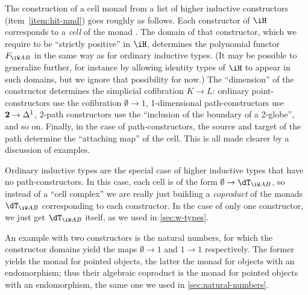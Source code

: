\documentclass{amsart}
\let\W\iW
\begin{document}
The construction of a cell monad from a list of higher inductive constructors (item~\ref{item:hit-mnd}) goes roughly as follows.
Each constructor of $\iH$ corresponds to a \emph{cell} of the monad \dT.
The domain of that constructor, which we require to be ``strictly positive'' in $\iH$, determines the polynomial functor $F_{\W A B}$ in the same way as for ordinary inductive types.
(It may be possible to generalize further, for instance by allowing identity types of $\iH$ to appear in such domains, but we ignore that possibility for now.)
The ``dimension'' of the constructor determines the simplicial cofibration $K\to L$: ordinary point-constructors use the cofibration $\emptyset\to 1$, 1-dimensional path-constructors use $\mathbf{2}\to{\Delta^1}$, 2-path constructors use the ``inclusion of the boundary of a 2-globe'', and so on.
Finally, in the case of path-constructors, the source and target of the path determine the ``attaching map'' of the cell.
This is all made clearer by a discussion of examples.

\begin{eg} \label{eg:ordinary-inductives}
  Ordinary inductive types are the special case of higher inductive types that have no path-constructors.
  In this case, each cell is of the form $\emptyset \to \dT_{\W A B}$, so instead of a ``cell complex'' we are really just building a \emph{coproduct} of the monads $\dT_{\W A B}$ corresponding to each constructor.
  In the case of only one constructor, we just get $\dT_{\W A B}$ itself, as we used in \cref{sec:w-types}.

  An example with two constructors is the natural numbers, for which the constructor domains yield the maps $\emptyset\to 1$ and $1\to 1$ respectively.
  The former yields the monad for pointed objects, the latter the monad for objects with an endomorphism; thus their algebraic coproduct is the monad for pointed objects with an endomorphism, the same one we used in \cref{sec:natural-numbers}.
\end{eg}
\end{document}
